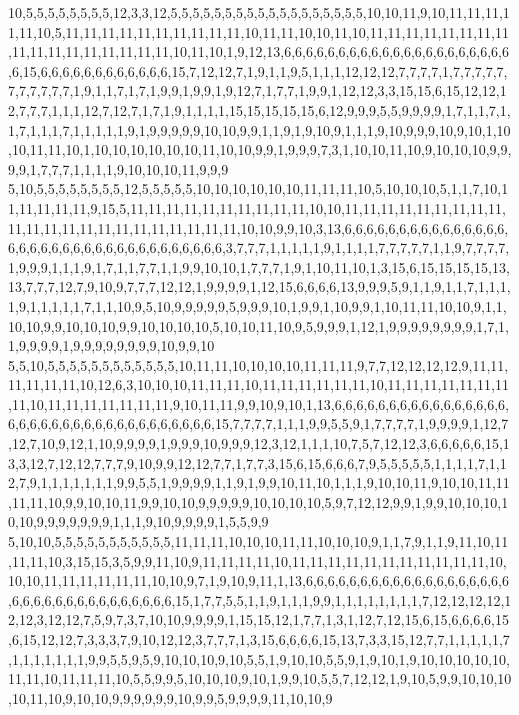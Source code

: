 10,5,5,5,5,5,5,5,5,12,3,3,12,5,5,5,5,5,5,5,5,5,5,5,5,5,5,5,5,5,5,10,10,11,9,10,11,11,11,11,11,10,5,11,11,11,11,11,11,11,11,11,11,10,11,11,10,10,11,10,11,11,11,11,11,11,11,11,11,11,11,11,11,11,11,11,11,10,11,10,1,9,12,13,6,6,6,6,6,6,6,6,6,6,6,6,6,6,6,6,6,6,6,6,6,6,15,6,6,6,6,6,6,6,6,6,6,6,6,15,7,12,12,7,1,9,1,1,9,5,1,1,1,12,12,12,7,7,7,7,1,7,7,7,7,7,7,7,7,7,7,7,1,9,1,1,7,1,7,1,9,9,1,9,9,1,9,12,7,1,7,7,1,9,9,1,12,12,3,3,15,15,6,15,12,12,12,7,7,7,1,1,1,12,7,12,7,1,7,1,9,1,1,1,1,15,15,15,15,15,6,12,9,9,9,5,5,9,9,9,9,1,7,1,1,7,1,1,7,1,1,1,7,1,1,1,1,1,9,1,9,9,9,9,9,10,10,9,9,1,1,9,1,9,10,9,1,1,1,9,10,9,9,9,10,9,10,1,10,10,11,11,10,1,10,10,10,10,10,10,11,10,10,9,9,1,9,9,9,7,3,1,10,10,11,10,9,10,10,10,9,9,9,9,1,7,7,7,1,1,1,1,9,10,10,10,11,9,9,9
5,10,5,5,5,5,5,5,5,5,12,5,5,5,5,5,10,10,10,10,10,10,11,11,11,10,5,10,10,10,5,1,1,7,10,11,11,11,11,11,9,15,5,11,11,11,11,11,11,11,11,11,11,10,10,11,11,11,11,11,11,11,11,11,11,11,11,11,11,11,11,11,11,11,11,11,11,10,10,9,9,10,3,13,6,6,6,6,6,6,6,6,6,6,6,6,6,6,6,6,6,6,6,6,6,6,6,6,6,6,6,6,6,6,6,6,6,6,6,3,7,7,7,1,1,1,1,1,9,1,1,1,1,7,7,7,7,7,1,1,9,7,7,7,7,1,9,9,9,1,1,1,9,1,7,1,1,7,7,1,1,9,9,10,10,1,7,7,7,1,9,1,10,11,10,1,3,15,6,15,15,15,15,13,13,7,7,7,12,7,9,10,9,7,7,7,12,12,1,9,9,9,9,1,12,15,6,6,6,6,13,9,9,9,5,9,1,1,9,1,1,7,1,1,1,1,9,1,1,1,1,1,7,1,1,10,9,5,10,9,9,9,9,9,5,9,9,9,10,1,9,9,1,10,9,9,1,10,11,11,10,10,9,1,1,10,10,9,9,10,10,10,9,9,10,10,10,10,5,10,10,11,10,9,5,9,9,9,1,12,1,9,9,9,9,9,9,9,9,1,7,1,1,9,9,9,9,1,9,9,9,9,9,9,9,9,10,9,9,10
5,5,10,5,5,5,5,5,5,5,5,5,5,5,5,10,11,11,10,10,10,10,11,11,11,9,7,7,12,12,12,12,9,11,11,11,11,11,11,10,12,6,3,10,10,10,11,11,11,10,11,11,11,11,11,11,10,11,11,11,11,11,11,11,11,10,11,11,11,11,11,11,11,9,10,11,11,9,9,10,9,10,1,13,6,6,6,6,6,6,6,6,6,6,6,6,6,6,6,6,6,6,6,6,6,6,6,6,6,6,6,6,6,6,6,6,6,6,6,15,7,7,7,7,1,1,1,9,9,5,5,9,1,7,7,7,7,1,9,9,9,9,1,12,7,12,7,10,9,12,1,10,9,9,9,9,1,9,9,9,10,9,9,9,12,3,12,1,1,1,10,7,5,7,12,12,3,6,6,6,6,6,15,13,3,12,7,12,12,7,7,7,9,10,9,9,12,12,7,7,1,7,7,3,15,6,15,6,6,6,7,9,5,5,5,5,5,1,1,1,1,7,1,12,7,9,1,1,1,1,1,1,1,9,9,5,5,1,9,9,9,9,1,1,9,1,9,9,10,11,10,1,1,1,9,10,10,11,9,10,10,11,11,11,11,10,9,9,10,10,11,9,9,10,10,9,9,9,9,9,10,10,10,10,5,9,7,12,12,9,9,1,9,9,10,10,10,10,10,9,9,9,9,9,9,9,1,1,1,9,10,9,9,9,9,1,5,5,9,9
5,10,10,5,5,5,5,5,5,5,5,5,5,5,11,11,11,10,10,10,11,11,10,10,10,9,1,1,7,9,1,1,9,11,10,11,11,11,10,3,15,15,3,5,9,9,11,10,9,11,11,11,11,10,11,11,11,11,11,11,11,11,11,11,11,10,10,10,11,11,11,11,11,11,10,10,9,7,1,9,10,9,11,1,13,6,6,6,6,6,6,6,6,6,6,6,6,6,6,6,6,6,6,6,6,6,6,6,6,6,6,6,6,6,6,6,6,6,6,15,1,7,7,5,5,1,1,9,1,1,1,9,9,1,1,1,1,1,1,1,1,7,12,12,12,12,12,12,3,12,12,7,5,9,7,3,7,10,10,9,9,9,9,1,15,15,12,1,7,7,1,3,1,12,7,12,15,6,15,6,6,6,6,15,6,15,12,12,7,3,3,3,7,9,10,12,12,3,7,7,7,1,3,15,6,6,6,6,15,13,7,3,3,15,12,7,7,1,1,1,1,1,7,1,1,1,1,1,1,1,9,9,5,5,9,5,9,10,10,10,9,10,5,5,1,9,10,10,5,5,9,1,9,10,1,9,10,10,10,10,10,11,11,10,11,11,11,10,5,5,9,9,5,10,10,10,9,10,1,9,9,10,5,5,7,12,12,1,9,10,5,9,9,10,10,10,10,11,10,9,10,10,9,9,9,9,9,9,10,9,9,5,9,9,9,9,11,10,10,9
